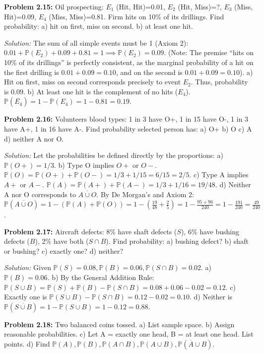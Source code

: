 \documentclass[11pt]{article}
\newcommand{\prob}[1]{\vspace{4mm}\noindent\textbf{Problem #1:}}
\newcommand{\sol}{\vspace{2mm}\noindent\textit{Solution: }}
\begin{document}
\prob{2.15}
Oil prospecting: $E_1$ (Hit, Hit)=0.01, $E_2$ (Hit, Miss)=?, $E_3$ (Miss, Hit)=0.09, $E_4$ (Miss, Miss)=0.81. Firm hits on 10\% of its drillings. Find probability:
a) hit on first, miss on second. b) at least one hit.

\sol 
The sum of all simple events must be 1 (Axiom 2):
$0.01 + \mathbb{P}(E_2) + 0.09 + 0.81 = 1 \implies \mathbb{P}(E_2) = 0.09$.
(Note: The premise ``hits on 10\% of its drillings'' is perfectly consistent, as the marginal probability of a hit on the first drilling is $0.01 + 0.09 = 0.10$, and on the second is $0.01 + 0.09 = 0.10$).
a) Hit on first, miss on second corresponds precisely to event $E_2$. Thus, probability is $0.09$.
b) At least one hit is the complement of no hits ($E_4$). 
$\mathbb{P}(\overline{E_4}) = 1 - \mathbb{P}(E_4) = 1 - 0.81 = 0.19$.

\prob{2.16}
Volunteers blood types: 1 in 3 have O+, 1 in 15 have O-, 1 in 3 have A+, 1 in 16 have A-. Find probability selected person has: a) O+ b) O c) A d) neither A nor O.

\sol 
Let the probabilities be defined directly by the proportions:
a) $\mathbb{P}(O+) = 1/3$.
b) Type O implies $O+$ or $O-$. $\mathbb{P}(O) = \mathbb{P}(O+) + \mathbb{P}(O-) = 1/3 + 1/15 = 6/15 = 2/5$.
c) Type A implies $A+$ or $A-$. $\mathbb{P}(A) = \mathbb{P}(A+) + \mathbb{P}(A-) = 1/3 + 1/16 = 19/48$.
d) Neither A nor O corresponds to $\overline{A \cup O}$. By De Morgan's and Axiom 2:
$\mathbb{P}(\overline{A \cup O}) = 1 - (\mathbb{P}(A) + \mathbb{P}(O)) = 1 - \left( \frac{19}{48} + \frac{2}{5} \right) = 1 - \frac{95 + 96}{240} = 1 - \frac{191}{240} = \frac{49}{240}$.

\prob{2.17}
Aircraft defects: 8\% have shaft defects ($S$), 6\% have bushing defects ($B$), 2\% have both ($S \cap B$). Find probability: a) bushing defect? b) shaft or bushing? c) exactly one? d) neither?

\sol 
Given $\mathbb{P}(S)=0.08, \mathbb{P}(B)=0.06, \mathbb{P}(S \cap B)=0.02$.
a) $\mathbb{P}(B) = 0.06$.
b) By the General Addition Rule: $\mathbb{P}(S \cup B) = \mathbb{P}(S) + \mathbb{P}(B) - \mathbb{P}(S \cap B) = 0.08 + 0.06 - 0.02 = 0.12$.
c) Exactly one is $\mathbb{P}(S \cup B) - \mathbb{P}(S \cap B) = 0.12 - 0.02 = 0.10$.
d) Neither is $\mathbb{P}(\overline{S \cup B}) = 1 - \mathbb{P}(S \cup B) = 1 - 0.12 = 0.88$.

\prob{2.18}
Two balanced coins tossed. a) List sample space. b) Assign reasonable probabilities. c) Let A = exactly one head, B = at least one head. List points. d) Find $\mathbb{P}(A), \mathbb{P}(B), \mathbb{P}(A \cap B), \mathbb{P}(A \cup B), \mathbb{P}(\overline{A} \cup B)$.
\end{document}
